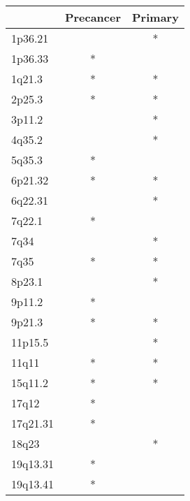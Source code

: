\begin{tabular}{lcc}
\toprule
{} & Precancer & Primary \\
\midrule
1p36.21  &           &       * \\
1p36.33  &         * &         \\
1q21.3   &         * &       * \\
2p25.3   &         * &       * \\
3p11.2   &           &       * \\
4q35.2   &           &       * \\
5q35.3   &         * &         \\
6p21.32  &         * &       * \\
6q22.31  &           &       * \\
7q22.1   &         * &         \\
7q34     &           &       * \\
7q35     &         * &       * \\
8p23.1   &           &       * \\
9p11.2   &         * &         \\
9p21.3   &         * &       * \\
11p15.5  &           &       * \\
11q11    &         * &       * \\
15q11.2  &         * &       * \\
17q12    &         * &         \\
17q21.31 &         * &         \\
18q23    &           &       * \\
19q13.31 &         * &         \\
19q13.41 &         * &         \\
\bottomrule
\end{tabular}
